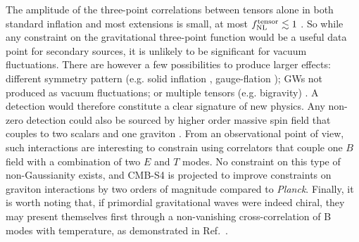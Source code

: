 
The amplitude of the three-point correlations between tensors alone in both standard inflation and most extensions is small, at most $f^{\rm tensor}_{\rm NL}\lesssim 1$ \cite{Maldacena:2002vr,Maldacena:2011nz}. So while any constraint on the gravitational three-point function would be a useful data point for secondary sources, it is unlikely to be significant for vacuum fluctuations. There are however a few possibilities to produce larger effects: different symmetry pattern (e.g. solid inflation \cite{Endlich:2012pz}, gauge-flation \cite{Maleknejad:2011jw}); GWs not produced as vacuum fluctuations; or multiple tensors (e.g. bigravity) \cite{Bordin:2016ruc}. A detection would therefore constitute a clear signature of new physics. Any non-zero detection could also be sourced by higher order massive spin field that couples to two scalars and one graviton \cite{Dimastrogiovanni:2015pla}. From an observational point of view, such interactions are interesting to constrain using correlators that couple one $B$ field with a combination of two $E$ and $T$ modes. No constraint on this type of non-Gaussianity exists, and CMB-S4 is projected to improve constraints on graviton interactions by two orders of magnitude \cite{Meerburg:2016ecv} compared to {\it Planck}.  Finally, it is worth noting that, if primordial gravitational waves were indeed chiral, they may present themselves first through a non-vanishing cross-correlation of B modes with temperature, as demonstrated in Ref.~\cite{Contaldi:2008yz}.

